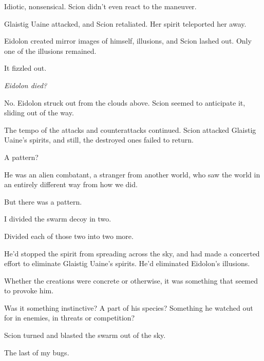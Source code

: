 Idiotic, nonsensical.  Scion didn't even react to the maneuver.



Glaistig Uaine attacked, and Scion retaliated.  Her spirit teleported her away.



Eidolon created mirror images of himself, illusions, and Scion lashed out.  Only one of the illusions remained.



It fizzled out.



\emph{Eidolon died?}



No.  Eidolon struck out from the clouds above.  Scion seemed to anticipate it, sliding out of the way.



The tempo of the attacks and counterattacks continued.  Scion attacked Glaistig Uaine's spirits, and still, the destroyed ones failed to return.



A pattern?



He was an alien combatant, a stranger from another world, who saw the world in an entirely different way from how we did.



But there was a pattern.



I divided the swarm decoy in two.



Divided each of those two into two more.



He'd stopped the spirit from spreading across the sky, and had made a concerted effort to eliminate Glaistig Uaine's spirits.  He'd eliminated Eidolon's illusions.



Whether the creations were concrete or otherwise, it was something that seemed to provoke him.



Was it something instinctive?  A part of his species?  Something he watched out for in enemies, in threats or competition?



Scion turned and blasted the swarm out of the sky.



The last of my bugs.



